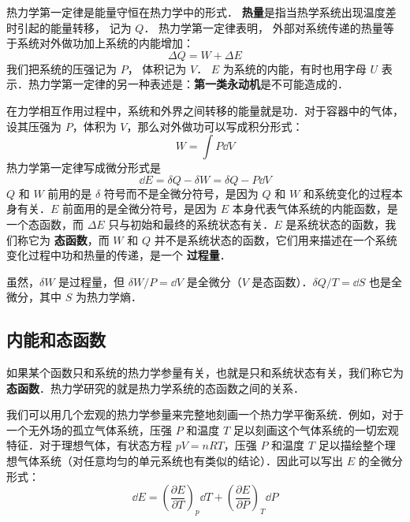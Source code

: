 
\begin{issues}
\issueDraft
\end{issues}


热力学第一定律是能量守恒在热力学中的形式． \textbf{热量}是指当热学系统出现温度差时引起的能量转移， 记为 $Q$． 热力学第一定律表明， 外部对系统传递的热量等于系统对外做功加上系统的内能增加：
\begin{equation}\label{Th1Law_eq1}
\Delta Q = W + \Delta E
\end{equation}
我们把系统的压强记为 $P$， 体积记为 $V$． $E$ 为系统的内能，有时也用字母 $U$ 表示．热力学第一定律的另一种表述是：\textbf{第一类永动机}是不可能造成的．


在力学相互作用过程中，系统和外界之间转移的能量就是功．对于容器中的气体，设其压强为 $P$，体积为 $V$，那么对外做功可以写成积分形式：
\begin{equation}
W = \int P \dd{V}
\end{equation}
热力学第一定律写成微分形式是
\begin{equation}\label{Th1Law_eq2}
\dd E=\delta Q-\delta W=\delta Q-P\dd V
\end{equation}
$Q$ 和 $W$ 前用的是 $\delta$ 符号而不是全微分符号，是因为 $Q$ 和 $W$ 和系统变化的过程本身有关．$E$ 前面用的是全微分符号，是因为 $E$ 本身代表气体系统的内能函数，是一个态函数，而 $\Delta E$ 只与初始和最终的系统状态有关．$E$ 是系统状态的函数，我们称它为 \textbf{态函数}，而 $W$ 和 $Q$ 并不是系统状态的函数，它们用来描述在一个系统变化过程中功和热量的传递，是一个 \textbf{过程量}．

虽然，$\delta W$ 是过程量，但 $\delta W/P=\dd V$ 是全微分（$V$ 是态函数）．$\delta Q/T=\dd S$ 也是全微分，其中 $S$ 为热力学熵．

\subsection{内能和态函数}
如果某个函数只和系统的热力学参量有关，也就是只和系统状态有关，我们称它为\textbf{态函数}．热力学研究的就是热力学系统的态函数之间的关系．

我们可以用几个宏观的热力学参量来完整地刻画一个热力学平衡系统．例如，对于一个无外场的孤立气体系统，压强 $P$ 和温度 $T$ 足以刻画这个气体系统的一切宏观特征．对于理想气体，有状态方程 $pV=nRT$，压强 $P$ 和温度 $T$ 足以描绘整个理想气体系统（对任意均匀的单元系统也有类似的结论）．因此可以写出 $E$ 的全微分形式：
\begin{equation}
\dd E=\left(\frac{\partial E}{\partial T}\right)_p \dd T + \left(\frac{\partial E}{\partial P}\right)_T \dd P
\end{equation}

